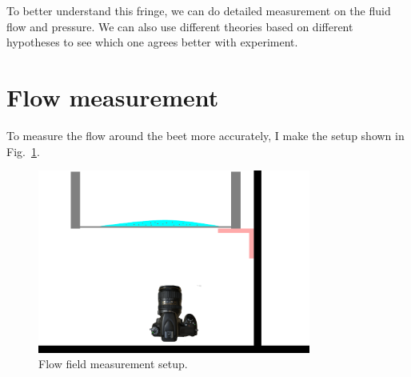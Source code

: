\documentclass[12pt]{article}
\begin{document}
To better understand this fringe, we can do detailed measurement on the fluid flow and pressure. We can also use different theories based on different hypotheses to see which one agrees better with experiment.

\section{Flow measurement}

To measure the flow around the beet more accurately, I make the setup shown in Fig.~\ref{fig:flow_setup}.

\begin{figure}
    \centering
    \includegraphics[width=0.8\textwidth]{Figures/flow_setup.pdf}
    \caption{Flow field measurement setup.}
    \label{fig:flow_setup}
\end{figure}

\newpage
 

\end{document}
